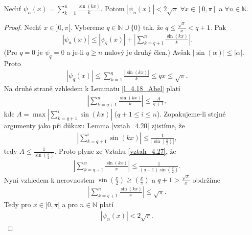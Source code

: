 \begin{lemma}\label{l_4.23}
Nechť $\psi_n (x) = \sum \limits _{k=1}^n \frac{\sin (kx)}{k}$. Potom $| \psi_n (x)| < 2 \sqrt{\pi} $ $ \forall x \in [0,\pi]$ a $ \forall n \in \mathbb{N}$.
\begin{proof}
Nechť $x \in ]0, \pi[$. Vybereme $q \in \mathbb{N} \cup \{ 0 \}$ tak, že $q \leq \frac{\sqrt{\pi}}{x} < q + 1$. Pak
\begin{align*}
| \psi_n (x)| \leq | \psi_q (x)| + \left| \sum \limits _{k=q+1}^n \frac{\sin (kx)}{k} \right|.
\end{align*}
(Pro $q=0$ je $\psi_q=0$ a je-li $q \geq n$ nulový je druhý člen.) Avšak $| \sin (\alpha)| \leq | \alpha |$. Proto
\begin{align*}
| \psi_q (x) | \leq \sum \limits _{k=1}^q \frac{| \sin (kx)|}{k} \leq qx \leq \sqrt{\pi}.
\end{align*}
Na druhé straně vzhledem k Lemmatu \ref{l_4.18_Abel} platí
\begin{align}\label{vztah_4.27}
\left| \sum \limits _{k=q+1}^n \frac{\sin(kx)}{k} \right| \leq \frac{A}{q+1},
\end{align}
kde $A = \max \left| \sum \limits _{k=q+1}^{i} \sin(kx) \right|$ ($q+1 \leq i \leq n$). Zopakujeme-li stejné argumenty jako při důkazu Lemma \eqref{vztah_4.20} zjistíme, že
\begin{align*}
\left| \sum \limits _{k=q+1}^{i} \sin(kx) \right| \leq \frac{1}{| \sin (\frac{x}{2})|},
\end{align*}
tedy $A \leq \frac{1}{\sin (\frac{x}{2})}$. Proto plyne ze Vztahu \eqref{vztah_4.27}, že
\begin{align*}
\left| \sum \limits _{k=q+1}^n \frac{\sin(kx)}{x} \right| \leq \frac{1}{(q+1) \sin \left( \frac{x}{2} \right)}.
\end{align*}
Nyní vzhledem k nerovnostem $\sin (\frac{x}{2}) \geq (\frac{x}{\pi})$ a $q+1 > \frac{\sqrt{\pi}}{x}$ obdržíme
\begin{align*}
\left| \sum \limits _{k=q+1}^n \frac{\sin(kx)}{x} \right| \leq \sqrt{\pi}.
\end{align*}
Tedy pro $x \in ]0, \pi[$ a pro $n \in \mathbb{N}$ platí
\begin{align*}
| \psi_n (x)| < 2 \sqrt{\pi}.
\end{align*}
\end{proof}
\end{lemma}

